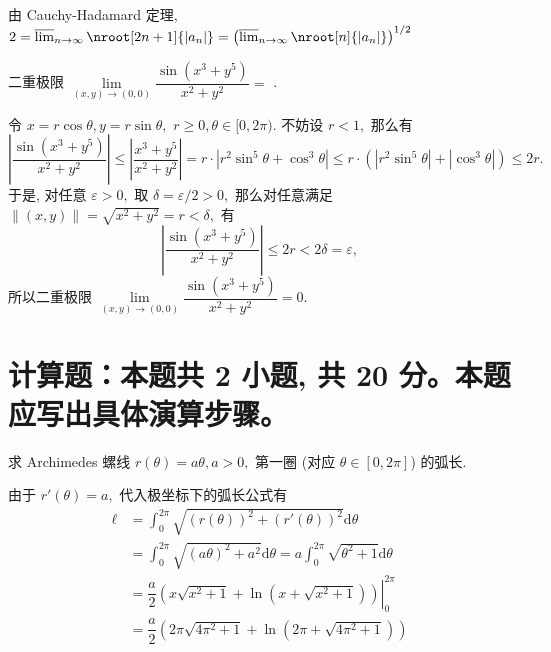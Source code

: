 \begin{solution}
由 Cauchy-Hadamard 定理, $2 = \varlimsup_{n\to\infty}\nroot[2n+1]{\lvert a_n
\rvert} = \left( \varlimsup_{n\to\infty}\nroot[n]{\lvert a_n \rvert} \right)^{1/2}$
\end{solution}

\begin{question}
二重极限 $\lim\limits_{(x,y) \to (0,0)} \dfrac{\sin(x^3 + y^5)}{x^2 + y^2} =$ \fillin[$0$].
\end{question}

\begin{solution}
令 $x = r\cos\theta, y = r\sin\theta,$ $r \geqslant 0, \theta \in [0, 2\pi).$ 不妨设 $r < 1,$ 那么有
\[\left\lvert \dfrac{\sin(x^3 + y^5)}{x^2 + y^2} \right\rvert \leqslant \left\lvert \dfrac{x^3 + y^5}{x^2 + y^2} \right\rvert = r \cdot \left\lvert r^2\sin^5\theta + \cos^3\theta \right\rvert \leqslant r \cdot \left( \left\lvert r^2\sin^5\theta \right\rvert + \left\lvert \cos^3\theta \right\rvert \right) \leqslant 2 r.\]
于是, 对任意 $\varepsilon > 0,$ 取 $\delta = \varepsilon / 2 > 0,$ 那么对任意满足 $\lVert (x, y) \rVert = \sqrt{x^2 + y^2} = r < \delta,$ 有
\[\left\lvert \dfrac{\sin(x^3 + y^5)}{x^2 + y^2} \right\rvert \leqslant 2r < 2\delta = \varepsilon,\]
所以二重极限 $\lim\limits_{(x,y) \to (0,0)} \dfrac{\sin(x^3 + y^5)}{x^2 + y^2} = 0.$
\end{solution}


\section{计算题：本题共 2 小题, 共 20 分。本题应写出具体演算步骤。}


\begin{question}[points = 10]
求 Archimedes 螺线 $r(\theta) = a\theta, a > 0,$ 第一圈 (对应 $\theta \in [0, 2\pi]$) 的弧长.

\end{question}

\begin{solution}
由于 $r'(\theta) = a,$ 代入极坐标下的弧长公式有
\begin{align*}
\ell & = \int_{0}^{2\pi} \sqrt{\left(r(\theta)\right)^2 + \left(r'(\theta)\right)^2} \mathrm{d} \theta \\
& = \int_{0}^{2\pi} \sqrt{\left(a \theta\right)^2 + a^2} \mathrm{d} \theta = a \int_{0}^{2\pi} \sqrt{\theta^2 + 1} \mathrm{d} \theta \\
& = \left. \dfrac{a}{2} \left( x \sqrt{x^2 + 1} + \ln \left( x + \sqrt{x^2 + 1} \right) \right) \right|_{0}^{2\pi} \\
& = \dfrac{a}{2} \left( 2\pi \sqrt{4 \pi^2 + 1} + \ln \left( 2\pi + \sqrt{4 \pi^2 + 1} \right) \right)
\end{align*}
\end{solution}

